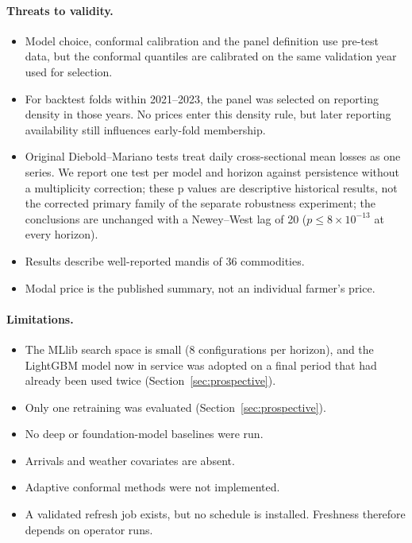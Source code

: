 \paragraph{Threats to validity.}
\begin{itemize}
  \item Model choice, conformal calibration and the panel definition use pre-test data, but the conformal quantiles are calibrated on the same validation year used for selection.
  \item For backtest folds within 2021--2023, the panel was selected on reporting density in those years. No prices enter this density rule, but later reporting availability still influences early-fold membership.
  \item Original Diebold--Mariano tests treat daily cross-sectional mean losses as one series. We report one test per model and horizon against persistence without a multiplicity correction; these p values are descriptive historical results, not the corrected primary family of the separate robustness experiment; the conclusions are unchanged with a Newey--West lag of 20 ($p\le8\times10^{-13}$ at every horizon).
  \item Results describe well-reported mandis of 36 commodities.
  \item Modal price is the published summary, not an individual farmer's price.
\end{itemize}

\paragraph{Limitations.}
\begin{itemize}
  \item The MLlib search space is small (8 configurations per horizon), and the LightGBM model now in service was adopted on a final period that had already been used twice (Section~\ref{sec:prospective}).
  \item Only one retraining was evaluated (Section~\ref{sec:prospective}).
  \item No deep or foundation-model baselines were run.
  \item Arrivals and weather covariates are absent.
  \item Adaptive conformal methods were not implemented.
  \item A validated refresh job exists, but no schedule is installed. Freshness therefore depends on operator runs.
\end{itemize}

